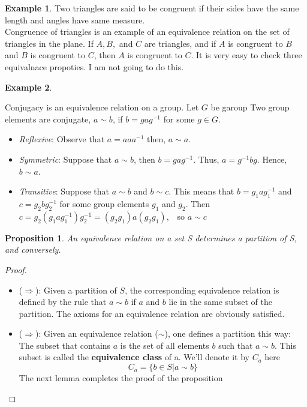 \documentclass[
]{book}
\providecommand{\tightlist}{%
  \setlength{\itemsep}{0pt}\setlength{\parskip}{0pt}}
\newtheorem{proposition}{Proposition}[chapter]
\theoremstyle{definition}
\theoremstyle{definition}
\newtheorem{example}{Example}[chapter]
\theoremstyle{definition}
\theoremstyle{definition}
\theoremstyle{remark}
\begin{document}
\begin{example}
\protect\hypertarget{exm:unnamed-chunk-30}{}\label{exm:unnamed-chunk-30}Two triangles are said to be congruent if their sides have the same length and angles have same measure.\\
Congruence of triangles is an example of an equivalence relation on the set of triangles in the plane. If \(A , B,\) and \(C\) are triangles, and if \(A\) is congruent to \(B\) and \(B\) is congruent to \(C\), then \(A\) is congruent to \(C\). It is very easy to check three equivalnace propoties. I am not going to do this.
\end{example}

\begin{example}
\protect\hypertarget{exm:unnamed-chunk-31}{}\label{exm:unnamed-chunk-31}

Conjugacy is an equivalence relation on a group.
Let \(G\) be garoup Two group elements are conjugate, \(a\sim b\), if \(b = gag^{- 1}\) for some \(g\in G\).

\begin{itemize}
\tightlist
\item
  \emph{Reflexive}: Observe that \(a=aaa^{-1}\) then, \(a\sim a\).
\item
  \emph{Symmetric}: Suppose that \(a\sim b\), then \(b=gag^{-1}\). Thus,
  \(a=g^{-1}bg\). Hence, \(b \sim a\).
\item
  \emph{Transitive}: Suppose that \(a\sim b\) and \(b \sim c\). This means that \(b = g_1ag_1^{-1}\) and \(c = g_2bg_2^{-1}\) for some group elements \(g_1\) and \(g_2\).
  Then \(c = g_2(g_1ag_1^{-1})g_2^{-1} = (g_2 g_1)a (g_2 g_1),\) ~so \(a \sim c\)
\end{itemize}

\end{example}

\begin{proposition}
\protect\hypertarget{prp:unnamed-chunk-32}{}\label{prp:unnamed-chunk-32}An equivalence relation on a set S determines a partition of S, and conversely.
\end{proposition}

\begin{proof}
\leavevmode

\begin{itemize}
\tightlist
\item
  (\(\Longrightarrow\)): Given a partition of \(S\), the corresponding equivalence relation is defined by the rule
  that \(a \sim b\) if \(a\) and \(b\) lie in the same subset of the partition. The axioms for an equivalence relation are obviously satisfied.
\item
  (\(\Longrightarrow\)): Given an equivalence relation (\(\sim\)), one defines a partition this way:\\
  The subset that contains \(a\) is the set of all elements \(b\) such that \(a \sim b\). This subset is called the \textbf{equivalence class} of a. We'll denote it by \(C_a\) here
  \[C_a = \{b \in S | a\sim b\}\]
  The next lemma completes the proof of the proposition
\end{itemize}

\end{proof}
\end{document}
